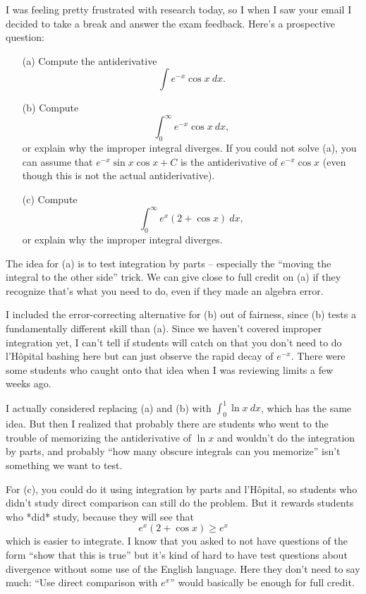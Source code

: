 \documentclass[10pt]{article}
\theoremstyle{definition}
\begin{document}
\noindent

I was feeling pretty frustrated with research today, so I when I saw your email I decided to take a break and answer the exam feedback.
Here's a prospective question:

\begin{itemize}
\item[(a)] Compute the antiderivative
$$\int e^{-x} \cos x ~dx.$$
\item[(b)] Compute $$\int_0^\infty e^{-x} \cos x ~dx,$$ or explain why the improper integral diverges. If you could not solve (a), you can assume that $e^{-x} \sin x \cos x + C$ is the antiderivative of $e^{-x} \cos x$ (even though this is not the actual antiderivative).
\item[(c)] Compute $$\int_0^\infty e^x (2 + \cos x) ~dx,$$ or explain why the improper integral diverges.
\end{itemize}

The idea for (a) is to test integration by parts -- especially the ``moving the integral to the other side'' trick.
We can give close to full credit on (a) if they recognize that's what you need to do, even if they made an algebra error.

I included the error-correcting alternative for (b) out of fairness, since (b) tests a fundamentally different skill than (a). 
Since we haven't covered improper integration yet, I can't tell if students will catch on that you don't need to do l'H\^opital bashing here but can just observe the rapid decay of $e^{-x}$.
There were some students who caught onto that idea when I was reviewing limits a few weeks ago.

I actually considered replacing (a) and (b) with $\int_0^1 \ln x ~dx$, which has the same idea.
But then I realized that probably there are students who went to the trouble of memorizing the antiderivative of $\ln x$ and wouldn't do the integration by parts, and probably ``how many obscure integrals can you memorize'' isn't something we want to test.

For (c), you could do it using integration by parts and l'H\^opital, so students who didn't study direct comparison can still do the problem.
But it rewards students who *did* study, because they will see that
$$e^x (2 + \cos x) \geq e^x$$
which is easier to integrate.
I know that you asked to not have questions of the form ``show that this is true'' but it's kind of hard to have test questions about divergence without some use of the English language.
Here they don't need to say much: ``Use direct comparison with $e^x$'' would basically be enough for full credit.
\end{document}
